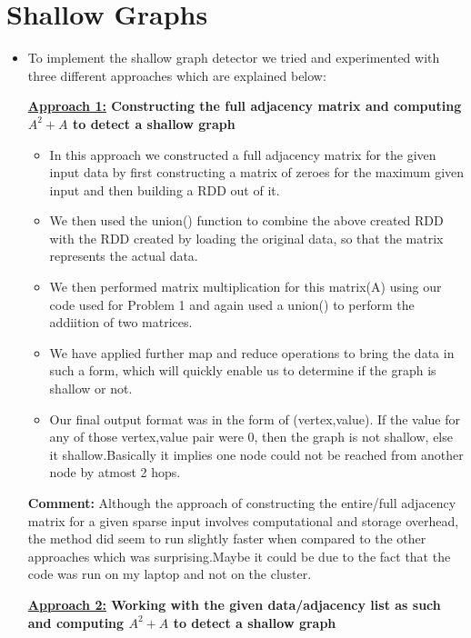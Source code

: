 \documentclass[11pt]{article}
\begin{document}
\section{Shallow Graphs}

\begin{itemize}

\item[] To implement the shallow graph detector we tried and experimented with three different approaches which are explained below:

\textbf{\underline{Approach 1:} Constructing the full adjacency matrix and computing $A^2 + A$ to detect a shallow graph}

\begin{itemize}
	

	\item In this approach we constructed a full adjacency matrix for the given input data by first constructing a matrix of zeroes for the maximum given input and then building a RDD out of it.
	\item We then used the union() function to combine the above created RDD with the RDD created by loading the original data, so that the matrix represents the actual data.
	\item We then performed matrix multiplication for this matrix(A) using our code used for Problem 1 and again used a union() to perform the addiition of two matrices.
	\item We have applied further map and reduce operations to bring the data in such a form, which will quickly enable us to determine if the graph is shallow or not.
	\item Our final output format was in the form of (vertex,value). If the value for any of those vertex,value pair were 0, then the graph is not shallow, else it shallow.Basically it implies one node could not be reached from another node by atmost 2 hops.

\end{itemize}

\textbf{Comment:} Although the approach of constructing the entire/full adjacency matrix for a given sparse input involves computational and storage overhead, the method did seem to run slightly faster when compared to the other approaches which was surprising.Maybe it could be due to the fact that the code was run on my laptop and not on the cluster. 

\textbf{\underline{Approach 2:} Working with the given data/adjacency list as such and  computing $A^2 + A$ to detect a shallow graph}


\end{itemize}
\end{document}
